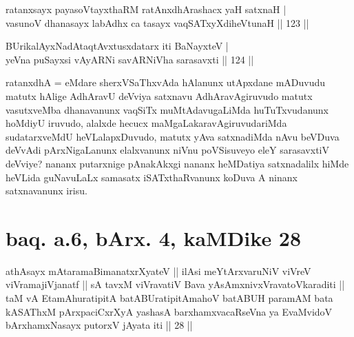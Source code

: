 
\begin{shl}
ratanxsayx payasoV\s tayxthaRM ratAnxdhArashacx yaH satxnaH | \\
vasunoV dhanasayx labAdhx ca tasayx vaqSATxyXdiheVtunaH \hfill|| 123 || 
\end{shl}

\begin{shl}
BUrikalAyxNadAtaqtAvxtusxdatarx iti BaNayxteV | \\
yeVna puSayxsi vAyARNi savARNiVha sarasavxti \hfill|| 124 || 
\end{shl}

\begin{artha}
ratanxdhA = eMdare sherxVSaThxvAda hAlanunx utApxdane mADuvudu matutx hAlige AdhAravU deVviya satxnavu AdhAravAgiruvudo matutx vasutxveMba dhanavanunx vaqSiTx muMtAdavugaLiMda huTuTxvudanunx hoMdiyU iruvudo, alalxde hecucx maMgaLakaravAgiruvudariMda sudatarxveMdU heVLalapxDuvudo, matutx yAva satxnadiMda nAvu beVDuva deVvAdi pArxNigaLanunx elalxvanunx niVnu poVSisuveyo eleY sarasavxtiV deVviye? nananx putarxnige pAnakAkxgi nananx heMDatiya satxnadalilx hiMde heVLida guNavuLaLx samasatx iSATxthaRvanunx koDuva A ninanx satxnavanunx irisu.
\end{artha}

\section*{baq. a.6, bArx. 4, kaMDike 28}

\begin{shl}
\footnotemark[1]athAsayx mAtaramaBimanatxrXyateV || ilAsi meYtArxvaruNiV viVreV viVramajiVjanatf || sA tavxM viVravatiV Bava yAsAmxnivxVravatoV\s karaditi || taM vA EtamAhuratipitA batABUratipitAmahoV batABUH paramAM bata kASAThxM pArxpaciCxrXyA yashasA barxhamxvacaRseVna ya EvaMvidoV bArxhamxNasayx putorxV jAyata iti || 28 ||
\end{shl}

